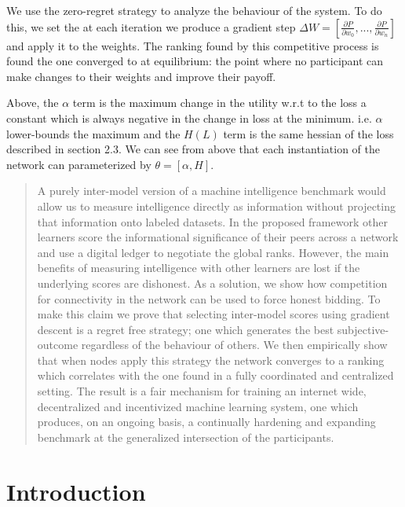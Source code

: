 \documentclass{article}
\begin{document}
We use the zero-regret strategy to analyze the behaviour of the system. To do this, we set the at each iteration we produce a gradient step $\Delta W = [\frac{\partial P}{\partial w_0}, ..., \frac{\partial P}{\partial w_n}]$ and apply it to the weights. The ranking found by this competitive process is found the one converged to at equilibrium: the point where no participant can make changes to their weights and improve their payoff.

Above, the $\alpha$ term is the maximum change in the utility w.r.t to the loss a constant which is always negative in the change in loss at the minimum. i.e. $\alpha$ lower-bounds the maximum and the $H(L)$ term is the same hessian of the loss described in section 2.3. We can see from above that each instantiation of the network can parameterized by $\theta = [\alpha, H]$.
\maketitle

\begin{abstract}

A purely inter-model version of a machine intelligence benchmark would allow us to measure intelligence directly as information without projecting that information onto labeled datasets. In the proposed framework other learners score the informational significance of their peers across a network and use a digital ledger to negotiate the global ranks. However, the main benefits of measuring intelligence with other learners are lost if the underlying scores are dishonest. As a solution, we show how competition for connectivity in the network can be used to force honest bidding. To make this claim we prove that selecting inter-model scores using gradient descent is a regret free strategy; one which generates the best subjective-outcome regardless of the behaviour of others. We then empirically show that when nodes apply this strategy the network converges to a ranking which correlates with the one found in a fully coordinated and centralized setting. The result is a fair mechanism for training an internet wide, decentralized and incentivized machine learning system, one which produces, on an ongoing basis, a continually hardening and expanding benchmark at the generalized intersection of the participants.

\end{abstract}

\section{Introduction}
\end{document}

